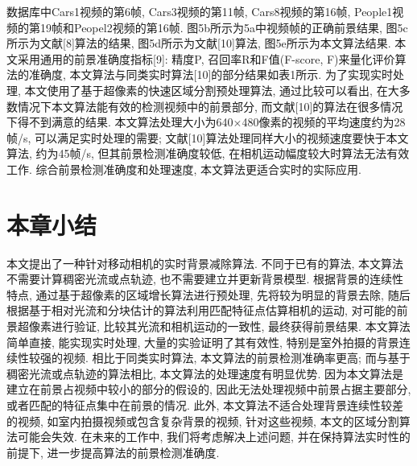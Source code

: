 数据库中Cars1视频的第6帧, Cars3视频的第11帧, Cars8视频的第16帧, People1视频的第19帧和Peopel2视频的第16帧. 图5b所示为5a中视频帧的正确前景结果, 图5c所示为文献[8]算法的结果, 图5d所示为文献[10]算法, 图5e所示为本文算法结果. 本文采用通用的前景准确度指标[9]: 精度P, 召回率R和F值(F-score, F)来量化评价算法的准确度, 本文算法与同类实时算法[10]的部分结果如表1所示. 为了实现实时处理, 本文使用了基于超像素的快速区域分割预处理算法, 通过比较可以看出, 在大多数情况下本文算法能有效的检测视频中的前景部分, 而文献[10]的算法在很多情况下得不到满意的结果.
本文算法处理大小为640×480像素的视频的平均速度约为28帧/s, 可以满足实时处理的需要; 文献[10]算法处理同样大小的视频速度要快于本文算法, 约为45帧/s, 但其前景检测准确度较低, 在相机运动幅度较大时算法无法有效工作. 综合前景检测准确度和处理速度, 本文算法更适合实时的实际应用.

 
\section{本章小结}
\label{ch5:sec:conclusions}
本文提出了一种针对移动相机的实时背景减除算法. 不同于已有的算法, 本文算法不需要计算稠密光流或点轨迹, 也不需要建立并更新背景模型. 根据背景的连续性特点, 通过基于超像素的区域增长算法进行预处理, 先将较为明显的背景去除, 随后根据基于相对光流和分块估计的算法利用匹配特征点估算相机的运动, 对可能的前景超像素进行验证, 比较其光流和相机运动的一致性, 最终获得前景结果. 本文算法简单直接, 能实现实时处理, 大量的实验证明了其有效性, 特别是室外拍摄的背景连续性较强的视频. 相比于同类实时算法, 本文算法的前景检测准确率更高; 而与基于稠密光流或点轨迹的算法相比, 本文算法的处理速度有明显优势.
因为本文算法是建立在前景占视频中较小的部分的假设的, 因此无法处理视频中前景占据主要部分, 或者匹配的特征点集中在前景的情况. 此外, 本文算法不适合处理背景连续性较差的视频, 如室内拍摄视频或包含复杂背景的视频, 针对这些视频, 本文的区域分割算法可能会失效. 在未来的工作中, 我们将考虑解决上述问题, 并在保持算法实时性的前提下, 进一步提高算法的前景检测准确度.
